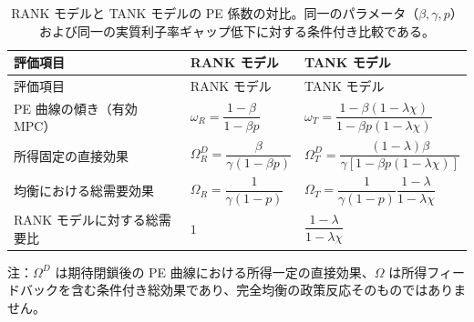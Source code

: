 \documentclass[
  japanese,
  lualatex,
  ja=standard,
  12pt,
  a4paper]{ltjsarticle}
\begin{document}
\begin{longtable}[]{@{}
  >{\raggedright\arraybackslash}p{}
  >{\raggedright\arraybackslash}p{}
  >{\raggedright\arraybackslash}p{}@{}}
\caption{RANK モデルと TANK モデルの PE
係数の対比。同一のパラメータ（\(\beta, \gamma, p\)）および同一の実質利子率ギャップ低下に対する条件付き比較である。}\label{tbl-rank-tank-comparison}\tabularnewline
\toprule\noalign{}
\begin{minipage}[b]{\linewidth}\raggedright
評価項目
\end{minipage} & \begin{minipage}[b]{\linewidth}\raggedright
RANK モデル
\end{minipage} & \begin{minipage}[b]{\linewidth}\raggedright
TANK モデル
\end{minipage} \\
\midrule\noalign{}
\endfirsthead
\toprule\noalign{}
\begin{minipage}[b]{\linewidth}\raggedright
評価項目
\end{minipage} & \begin{minipage}[b]{\linewidth}\raggedright
RANK モデル
\end{minipage} & \begin{minipage}[b]{\linewidth}\raggedright
TANK モデル
\end{minipage} \\
\midrule\noalign{}
\endhead
\bottomrule\noalign{}
\endlastfoot
PE 曲線の傾き（有効 MPC） & \(\omega_R = \dfrac{1-\beta}{1-\beta p}\) &
\(\omega_T = \dfrac{1 - \beta(1-\lambda\chi)}{1 - \beta p(1-\lambda\chi)}\) \\
所得固定の直接効果 & \(\Omega_R^D = \dfrac{\beta}{\gamma(1-\beta p)}\) &
\(\Omega_T^D = \dfrac{(1-\lambda)\beta}{\gamma[1 - \beta p(1-\lambda\chi)]}\) \\
均衡における総需要効果 & \(\Omega_R = \dfrac{1}{\gamma(1-p)}\) &
\(\Omega_T = \dfrac{1}{\gamma(1-p)}\dfrac{1-\lambda}{1-\lambda\chi}\) \\
RANK モデルに対する総需要比 & \(1\) &
\(\dfrac{1-\lambda}{1-\lambda\chi}\) \\
\end{longtable}

注：\(\Omega^D\) は期待閉鎖後の PE
曲線における所得一定の直接効果、\(\Omega\)
は所得フィードバックを含む条件付き総効果であり、完全均衡の政策反応そのものではありません。
\end{document}
